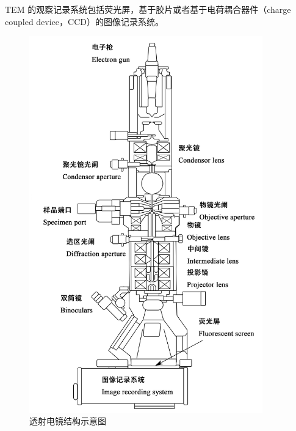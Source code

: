 TEM 的观察记录系统包括荧光屏，基于胶片或者基于电荷耦合器件（charge coupled device，CCD）的图像记录系统。

\begin{figure}[htbp]
	\vspace{\baselineskip}
	\centering
	\includegraphics[width=0.9\textwidth]{../1.2/12}
	\caption{透射电镜结构示意图}\label{fig:12}
\end{figure}

